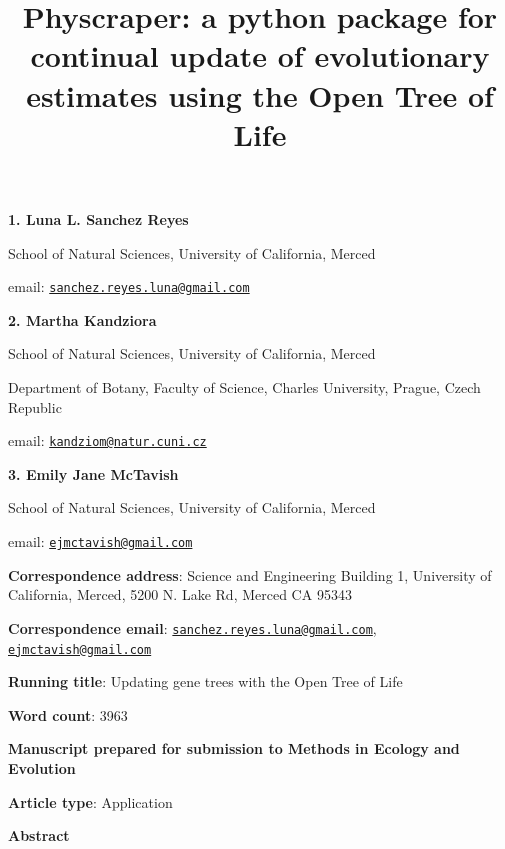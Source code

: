 \documentclass[]{article}
\title{Physcraper: a python package for continual update of evolutionary estimates using the Open Tree of Life}
\author{}
\date{\vspace{-2.5em}}
\begin{document}
\maketitle

\textbf{1. Luna L. Sanchez Reyes}

School of Natural Sciences, University of California, Merced

email: \href{mailto:sanchez.reyes.luna@gmail.com}{\nolinkurl{sanchez.reyes.luna@gmail.com}}

\textbf{2. Martha Kandziora}

School of Natural Sciences, University of California, Merced

Department of Botany, Faculty of Science, Charles University, Prague, Czech Republic

email: \href{mailto:kandziom@natur.cuni.cz}{\nolinkurl{kandziom@natur.cuni.cz}}

\textbf{3. Emily Jane McTavish}

School of Natural Sciences, University of California, Merced

email: \href{mailto:ejmctavish@gmail.com}{\nolinkurl{ejmctavish@gmail.com}}

\textbf{Correspondence address}: Science and Engineering Building 1, University of California, Merced, 5200 N. Lake Rd, Merced CA 95343

\textbf{Correspondence email}: \href{mailto:sanchez.reyes.luna@gmail.com}{\nolinkurl{sanchez.reyes.luna@gmail.com}}, \href{mailto:ejmctavish@gmail.com}{\nolinkurl{ejmctavish@gmail.com}}

\textbf{Running title}: Updating gene trees with the Open Tree of Life

\textbf{Word count}: 3963

\textbf{Manuscript prepared for submission to Methods in Ecology and Evolution}

\textbf{Article type}: Application

\newpage

\begingroup\Large

\textbf{Abstract}
\endgroup
\end{document}
